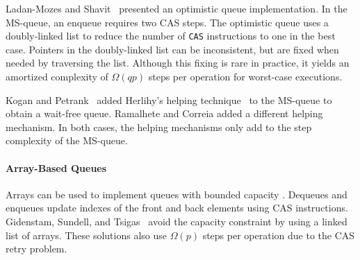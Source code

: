 Ladan-Mozes and Shavit~\cite{DBLP:journals/dc/Ladan-MozesS08}
presented an optimistic  queue implementation. 
In the MS-queue, an enqueue requires two CAS steps.
The optimistic queue uses a doubly-linked list to reduce the number of
\texttt{CAS} instructions to one in the best case. 
Pointers in the doubly-linked list can be inconsistent, but are fixed when needed by traversing the list.
Although this fixing is rare in practice, it yields an amortized complexity of $\Omega(qp)$ 
steps per operation for worst-case executions.

Kogan and Petrank~\cite{DBLP:conf/ppopp/KoganP11} 
added Herlihy's helping
technique~\cite{10.1145/114005.102808} to the MS-queue to obtain
a wait-free queue.
Ramalhete and Correia \cite{RC17} added a different helping mechanism.
In both cases, the helping mechanisms only add to the step complexity of the MS-queue.

\paragraph{Array-Based Queues}
Arrays can be used to implement queues with bounded capacity \cite{DBLP:conf/iceccs/ColvinG05,DBLP:conf/icdcn/Shafiei09,DBLP:conf/spaa/TsigasZ01}.  
Dequeues and enqueues update
indexes of the front and back elements using CAS instructions.
Gidenstam, Sundell, and Tsigas~\cite{DBLP:conf/opodis/GidenstamST10} avoid
the capacity constraint by using a linked list of arrays.
These solutions also use $\Omega(p)$ steps per operation due to the CAS retry problem.

